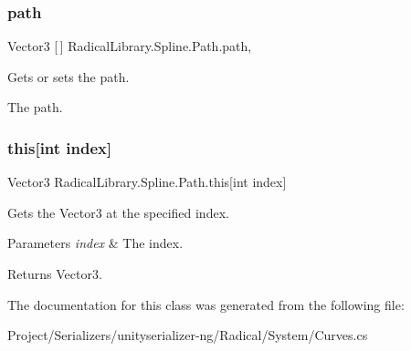 \subsubsection{\texorpdfstring{path}{path}}
{\footnotesize\ttfamily Vector3 \mbox{[}$\,$\mbox{]} Radical\+Library.\+Spline.\+Path.\+path\hspace{0.3cm}{\ttfamily [get]}, {\ttfamily [set]}}



Gets or sets the path. 

The path.\mbox{\label{class_radical_library_1_1_spline_1_1_path_a505ac35b3086ec5b8117259ecef2ee1e}} 
\subsubsection{\texorpdfstring{this[int index]}{this[int index]}}
{\footnotesize\ttfamily Vector3 Radical\+Library.\+Spline.\+Path.\+this\mbox{[}int index\mbox{]}\hspace{0.3cm}{\ttfamily [get]}}



Gets the Vector3 at the specified index. 


\begin{DoxyParams}{Parameters}
{\em index} & The index.\\
\hline
\end{DoxyParams}
\begin{DoxyReturn}{Returns}
Vector3.
\end{DoxyReturn}


The documentation for this class was generated from the following file\+:\begin{DoxyCompactItemize}
\item 
Project/\+Serializers/unityserializer-\/ng/\+Radical/\+System/Curves.\+cs\end{DoxyCompactItemize}
